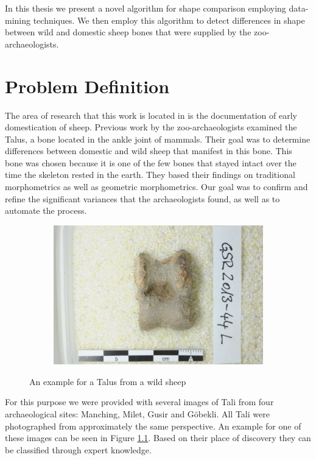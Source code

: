 \documentclass[pdftex,12pt,a4paper]{report}
\begin{document}
In this thesis we present a novel algorithm for shape comparison employing data-mining techniques. We then employ this algorithm to detect differences in shape between wild and domestic sheep bones that were supplied by the zoo-archaeologists.

\chapter{Problem Definition}
\label{chapter:problem-definition}

The area of research that this work is located in is the documentation of early domestication of sheep. Previous work by the zoo-archaeologists examined the Talus, a bone located in the ankle joint of mammals. Their goal was to determine differences between domestic and wild sheep that manifest in this bone. This bone was chosen because it is one of the few bones that stayed intact over the time the skeleton rested in the earth. They based their findings on traditional morphometrics as well as geometric morphometrics. Our goal was to confirm and refine the significant variances that the archaeologists found, as well as to automate the process.

\begin{figure}[h]
	\centering
	\begin{subfigure}[b]{0.65\textwidth}
		\centering
		\includegraphics[width=.9\linewidth]{img/example.jpg}
	\end{subfigure}
	\caption{An example for a Talus from a wild sheep}
	\label{fig:problem-example}
\end{figure}


For this purpose we were provided with several images of Tali from four archaeological sites: Manching, Milet, Gusir and Göbekli. All Tali were photographed from approximately the same perspective. An example for one of these images can be seen in Figure \ref{fig:problem-example}. Based on their place of discovery they can be classified through expert knowledge.
\end{document}
